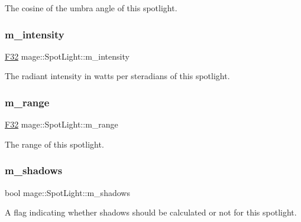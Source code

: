 The cosine of the umbra angle of this spotlight. \hypertarget{classmage_1_1_spot_light_a79110b6604c73210ba13725be7b66606}{}\label{classmage_1_1_spot_light_a79110b6604c73210ba13725be7b66606} 
\subsubsection{\texorpdfstring{m\+\_\+intensity}{m\_intensity}}
{\footnotesize\ttfamily \hyperlink{namespacemage_aa97e833b45f06d60a0a9c4fc22ae02c0}{F32} mage\+::\+Spot\+Light\+::m\+\_\+intensity\hspace{0.3cm}{\ttfamily [private]}}

The radiant intensity in watts per steradians of this spotlight. \hypertarget{classmage_1_1_spot_light_a53922fe395997f12003cd2dbc2f3ca7a}{}\label{classmage_1_1_spot_light_a53922fe395997f12003cd2dbc2f3ca7a} 
\subsubsection{\texorpdfstring{m\+\_\+range}{m\_range}}
{\footnotesize\ttfamily \hyperlink{namespacemage_aa97e833b45f06d60a0a9c4fc22ae02c0}{F32} mage\+::\+Spot\+Light\+::m\+\_\+range\hspace{0.3cm}{\ttfamily [private]}}

The range of this spotlight. \hypertarget{classmage_1_1_spot_light_aa744a471d0f1b39eb5ee435611bb42fe}{}\label{classmage_1_1_spot_light_aa744a471d0f1b39eb5ee435611bb42fe} 
\subsubsection{\texorpdfstring{m\+\_\+shadows}{m\_shadows}}
{\footnotesize\ttfamily bool mage\+::\+Spot\+Light\+::m\+\_\+shadows\hspace{0.3cm}{\ttfamily [private]}}

A flag indicating whether shadows should be calculated or not for this spotlight. 